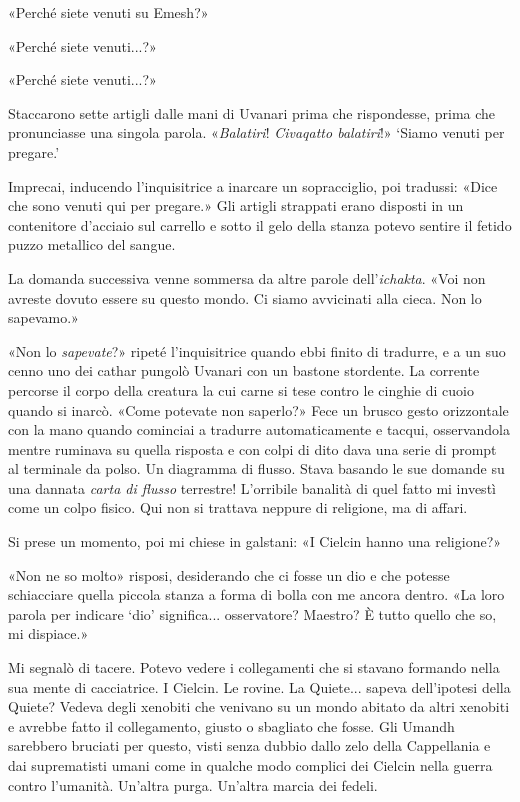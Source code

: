 «Perché siete venuti su Emesh?»

«Perché siete venuti...?»

«Perché siete venuti...?»

Staccarono sette artigli dalle mani di Uvanari prima che rispondesse,
prima che pronunciasse una singola parola. «\emph{Balatiri}!
\emph{Civaqatto balatiri}!» `Siamo venuti per pregare.'

Imprecai, inducendo l'inquisitrice a inarcare un sopracciglio, poi
tradussi: «Dice che sono venuti qui per pregare.» Gli artigli strappati
erano disposti in un contenitore d'acciaio sul carrello e sotto il gelo
della stanza potevo sentire il fetido puzzo metallico del sangue.

La domanda successiva venne sommersa da altre parole
dell'\emph{ichakta}. «Voi non avreste dovuto essere su questo mondo. Ci
siamo avvicinati alla cieca. Non lo sapevamo.»

«Non lo \emph{sapevate}?» ripeté l'inquisitrice quando ebbi finito di
tradurre, e a un suo cenno uno dei cathar pungolò Uvanari con un bastone
stordente. La corrente percorse il corpo della creatura la cui carne si
tese contro le cinghie di cuoio quando si inarcò. «Come potevate non
saperlo?» Fece un brusco gesto orizzontale con la mano quando cominciai
a tradurre automaticamente e tacqui, osservandola mentre ruminava su
quella risposta e con colpi di dito dava una serie di prompt al
terminale da polso. Un diagramma di flusso. Stava basando le sue domande
su una dannata \emph{carta di flusso} terrestre! L'orribile banalità di
quel fatto mi investì come un colpo fisico. Qui non si trattava neppure
di religione, ma di affari.

Si prese un momento, poi mi chiese in galstani: «I Cielcin hanno una
religione?»

«Non ne so molto» risposi, desiderando che ci fosse un dio e che potesse
schiacciare quella piccola stanza a forma di bolla con me ancora dentro.
«La loro parola per indicare `dio' significa... osservatore? Maestro? È
tutto quello che so, mi dispiace.»

Mi segnalò di tacere. Potevo vedere i collegamenti che si stavano
formando nella sua mente di cacciatrice. I Cielcin. Le rovine. La
Quiete... sapeva dell'ipotesi della Quiete? Vedeva degli xenobiti che
venivano su un mondo abitato da altri xenobiti e avrebbe fatto il
collegamento, giusto o sbagliato che fosse. Gli Umandh sarebbero
bruciati per questo, visti senza dubbio dallo zelo della Cappellania e
dai suprematisti umani come in qualche modo complici dei Cielcin nella
guerra contro l'umanità. Un'altra purga. Un'altra marcia dei fedeli.

